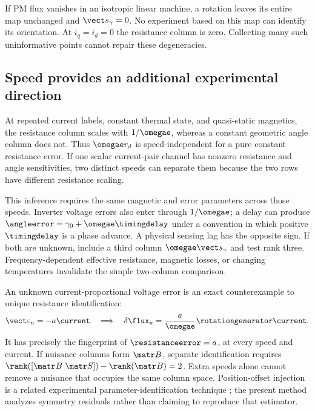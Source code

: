 If PM flux vanishes in an isotropic linear machine, a rotation leaves its
entire map unchanged and $\vect s_\gamma=0$. No experiment based on this map
can identify its orientation. At $i_q=i_d=0$ the resistance column is zero.
Collecting many such uninformative points cannot repair these degeneracies.

\subsection{Speed provides an additional experimental direction}
At repeated current labels, constant thermal state, and quasi-static
magnetics, the resistance column scales with $1/\omegae$, whereas a constant
geometric angle column does not. Thus $\omegae r_d$ is speed-independent for
a pure constant resistance error. If one scalar current-pair channel has
nonzero resistance and angle sensitivities, two distinct speeds can separate
them because the two rows have different resistance scaling.


This inference requires the same magnetic and error parameters across those
speeds. Inverter voltage errors also enter through $1/\omegae$; a delay can
produce $\angleerror=\gamma_0+\omegae\timingdelay$ under a convention in which positive
$\timingdelay$ is a phase advance. A physical sensing lag has the opposite sign.
If both are unknown, include a third column $\omegae\vect s_\gamma$ and
test rank three. Frequency-dependent effective resistance, magnetic losses,
or changing temperatures invalidate the simple two-column comparison.

An unknown current-proportional voltage error is an exact counterexample to
unique resistance identification:
\begin{equation}
 \vect\varepsilon_u=-a\current
 \quad\Longrightarrow\quad
 \delta\flux_u=\frac{a}{\omegae}\rotationgenerator\current.
 \label{eq:confounding}
\end{equation}
It has precisely the fingerprint of $\resistanceerror=a$, at every speed and current.
If nuisance columns form $\matr B$, separate identification requires
$\rank([\matr B\ \matr S])-\rank(\matr B)=2$. Extra speeds alone cannot
remove a nuisance that occupies the same column space. Position-offset
injection is a related experimental parameter-identification technique
\cite{liu2017}; the present method analyzes symmetry residuals rather than
claiming to reproduce that estimator.
